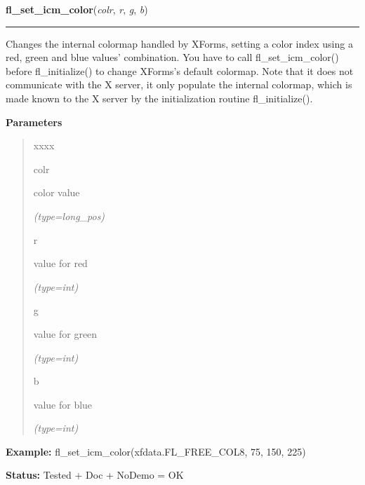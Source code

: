     \label{xformslib:flbasic:fl_set_icm_color}

    \vspace{0.5ex}

\hspace{.8\funcindent}\begin{boxedminipage}{\funcwidth}

    \raggedright \textbf{fl\_set\_icm\_color}(\textit{colr}, \textit{r}, \textit{g}, \textit{b})

    \vspace{-1.5ex}

    \rule{\textwidth}{0.5\fboxrule}
\setlength{\parskip}{2ex}
    Changes the internal colormap handled by XForms, setting a color index 
    using a red, green and blue values' combination. You have to call 
    fl\_set\_icm\_color() before fl\_initialize() to change XForms's 
    default colormap. Note that it does not communicate with the X server, 
    it only populate the internal colormap, which is made known to the X 
    server by the initialization routine fl\_initialize().

\setlength{\parskip}{1ex}
      \textbf{Parameters}
      \vspace{-1ex}

      \begin{quote}
        \begin{Ventry}{xxxx}

          \item[colr]

          color value

            {\it (type=long\_pos)}

          \item[r]

          value for red

            {\it (type=int)}

          \item[g]

          value for green

            {\it (type=int)}

          \item[b]

          value for blue

            {\it (type=int)}

        \end{Ventry}

      \end{quote}

\textbf{Example:} fl\_set\_icm\_color(xfdata.FL\_FREE\_COL8, 75, 150, 225)



\textbf{Status:} Tested + Doc + NoDemo = OK



    \end{boxedminipage}


